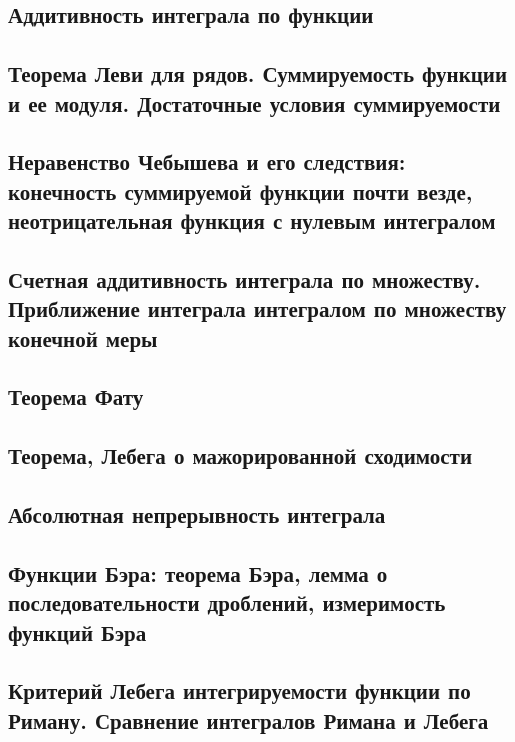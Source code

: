 \documentclass[12pt, a4paper, oneside]{memoir}
\begin{document}
\subsection{Аддитивность интеграла по функции}


\subsection{Теорема Леви для рядов. Суммируемость функции и ее модуля. Достаточные условия суммируемости}


\subsection{Неравенство Чебышева и его следствия: конечность суммируемой функции почти везде, неотрицательная функция с нулевым интегралом}


\subsection{Счетная аддитивность интеграла по множеству. Приближение интеграла интегралом по множеству конечной меры}


\subsection{Теорема Фату}


\subsection{Теорема, Лебега о мажорированной сходимости}


\subsection{Абсолютная непрерывность интеграла}


\subsection{Функции Бэра: теорема Бэра, лемма о последовательности дроблений, измеримость функций Бэра}


\subsection{Критерий Лебега интегрируемости функции по Риману. Сравнение интегралов Римана и Лебега}
\end{document}
